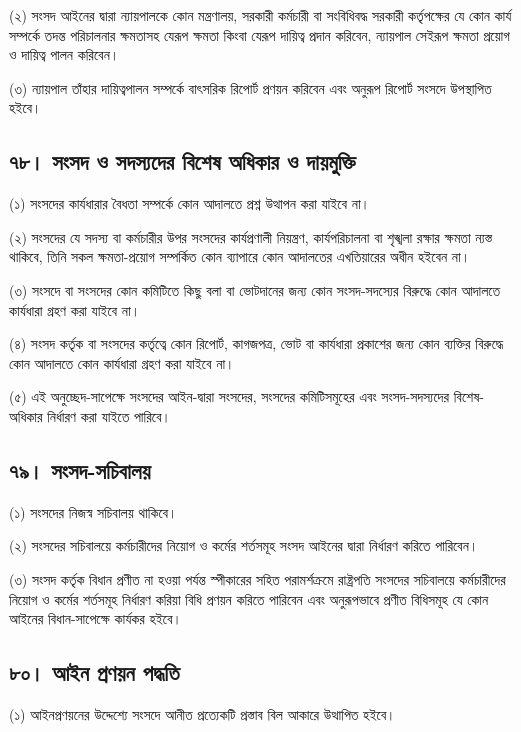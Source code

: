 \documentclass[11pt]{article}
\begin{document}
(২) সংসদ আইনের দ্বারা ন্যায়পালকে কোন মন্ত্রণালয়, সরকারী কর্মচারী বা
    সংবিধিবদ্ধ সরকারী কর্তৃপক্ষের যে কোন কার্য সম্পর্কে তদন্ত পরিচালনার ক্ষমতাসহ
    যেরূপ ক্ষমতা কিংবা যেরূপ দায়িত্ব প্রদান করিবেন, ন্যায়পাল সেইরূপ ক্ষমতা প্রয়োগ ও
    দায়িত্ব পালন করিবেন।

(৩) ন্যায়পাল তাঁহার দায়িত্বপালন সম্পর্কে বাৎসরিক রিপোর্ট প্রণয়ন করিবেন এবং
    অনুরূপ রিপোর্ট সংসদে উপস্থাপিত হইবে।

\subsection{৭৮। সংসদ ও সদস্যদের বিশেষ অধিকার ও দায়মুক্তি}
\label{sec:orge9cf788}
(১) সংসদের কার্যধারার বৈধতা সম্পর্কে কোন আদালতে প্রশ্ন উত্থাপন করা যাইবে না।

(২) সংসদের যে সদস্য বা কর্মচারীর উপর সংসদের কার্যপ্রণালী নিয়ন্ত্রণ,
    কার্যপরিচালনা বা শৃঙ্খলা রক্ষার ক্ষমতা ন্যস্ত থাকিবে, তিনি সকল ক্ষমতা-প্রয়োগ
    সম্পর্কিত কোন ব্যাপারে কোন আদালতের এখতিয়ারের অধীন হইবেন না।

(৩) সংসদে বা সংসদের কোন কমিটিতে কিছু বলা বা ভোটদানের জন্য কোন
    সংসদ-সদস্যের বিরুদ্ধে কোন আদালতে কার্যধারা গ্রহণ করা যাইবে না।

(৪) সংসদ কর্তৃক বা সংসদের কর্তৃত্বে কোন রিপোর্ট, কাগজপত্র, ভোট বা কার্যধারা
    প্রকাশের জন্য কোন ব্যক্তির বিরুদ্ধে কোন আদালতে কোন কার্যধারা গ্রহণ করা যাইবে
    না।

(৫) এই অনুচ্ছেদ-সাপেক্ষে সংসদের আইন-দ্বারা সংসদের, সংসদের কমিটিসমূহের এবং
    সংসদ-সদস্যদের বিশেষ-অধিকার নির্ধারণ করা যাইতে পারিবে।

\subsection{৭৯। সংসদ-সচিবালয়}
\label{sec:orgecd6613}
(১) সংসদের নিজস্ব সচিবালয় থাকিবে।

(২) সংসদের সচিবালয়ে কর্মচারীদের নিয়োগ ও কর্মের শর্তসমূহ সংসদ আইনের দ্বারা
    নির্ধারণ করিতে পারিবেন।

(৩) সংসদ কর্তৃক বিধান প্রণীত না হওয়া পর্যন্ত স্পীকারের সহিত পরামর্শক্রমে
    রাষ্ট্রপতি সংসদের সচিবালয়ে কর্মচারীদের নিয়োগ ও কর্মের শর্তসমূহ নির্ধারণ করিয়া
    বিধি প্রণয়ন করিতে পারিবেন এবং অনুরূপভাবে প্রণীত বিধিসমূহ যে কোন আইনের
    বিধান-সাপেক্ষে কার্যকর হইবে।

\subsection{৮০। আইন প্রণয়ন পদ্ধতি}
\label{sec:org395b300}
(১) আইনপ্রণয়নের উদ্দেশ্যে সংসদে আনীত প্রত্যেকটি প্রস্তাব বিল আকারে উত্থাপিত
    হইবে।
\end{document}

